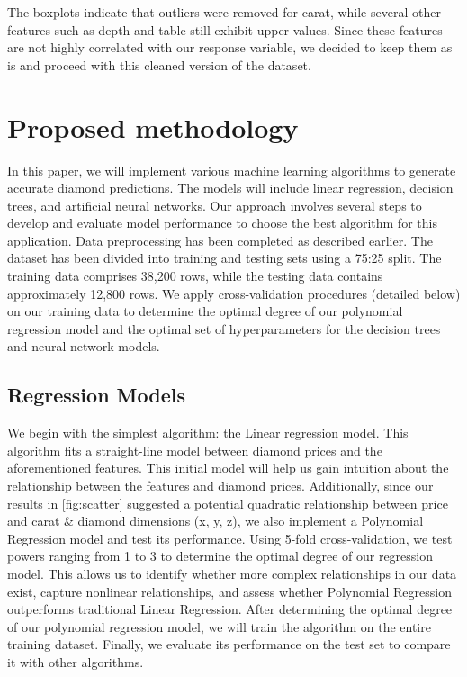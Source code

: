 \documentclass[conference]{IEEEtran}
\begin{document}
The boxplots indicate that outliers were removed for carat, while several other features such as depth and table still exhibit upper values. Since these features are not highly correlated with our response variable, we decided to keep them as is and proceed with this cleaned version of the dataset. 

\section{Proposed methodology}

In this paper, we will implement various machine learning algorithms to generate accurate diamond predictions. The models will include linear regression, decision trees, and artificial neural networks. Our approach involves several steps to develop and evaluate model performance to choose the best algorithm for this application. Data preprocessing has been completed as described earlier. The dataset has been divided into training and testing sets using a 75:25 split. The training data comprises 38,200 rows, while the testing data contains approximately 12,800 rows. We apply cross-validation procedures (detailed below) on our training data to determine the optimal degree of our polynomial regression model and the optimal set of hyperparameters for the decision trees and neural network models.

\subsection{Regression Models}

We begin with the simplest algorithm: the Linear regression model. This algorithm fits a straight-line model between diamond prices and the aforementioned features. This initial model will help us gain intuition about the relationship between the features and diamond prices. Additionally, since our results in \ref{fig:scatter} suggested a potential quadratic relationship between price and carat \& diamond dimensions (x, y, z), we also implement a Polynomial Regression model and test its performance. Using 5-fold cross-validation, we test powers ranging from 1 to 3 to determine the optimal degree of our regression model. This allows us to identify whether more complex relationships in our data exist, capture nonlinear relationships, and assess whether Polynomial Regression outperforms traditional Linear Regression. After determining the optimal degree of our polynomial regression model, we will train the algorithm on the entire training dataset. Finally, we evaluate its performance on the test set to compare it with other algorithms.
\end{document}
